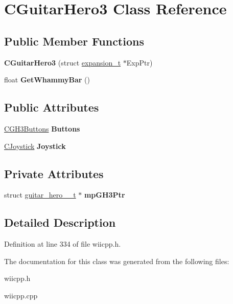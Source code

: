 \hypertarget{class_c_guitar_hero3}{\section{C\-Guitar\-Hero3 Class Reference}
\label{class_c_guitar_hero3}
}
\subsection*{Public Member Functions}
\begin{DoxyCompactItemize}
\item 
\hypertarget{class_c_guitar_hero3_afbef4e83211e146d2aef1064fcc24bb7}{{\bfseries C\-Guitar\-Hero3} (struct \hyperlink{structexpansion__t}{expansion\-\_\-t} $\ast$Exp\-Ptr)}\label{class_c_guitar_hero3_afbef4e83211e146d2aef1064fcc24bb7}

\item 
\hypertarget{class_c_guitar_hero3_ae4066620ae4ba771306e6439968504e6}{float {\bfseries Get\-Whammy\-Bar} ()}\label{class_c_guitar_hero3_ae4066620ae4ba771306e6439968504e6}

\end{DoxyCompactItemize}
\subsection*{Public Attributes}
\begin{DoxyCompactItemize}
\item 
\hypertarget{class_c_guitar_hero3_a70e8e38de7e281c5a7af18cf09747d48}{\hyperlink{class_c_g_h3_buttons}{C\-G\-H3\-Buttons} {\bfseries Buttons}}\label{class_c_guitar_hero3_a70e8e38de7e281c5a7af18cf09747d48}

\item 
\hypertarget{class_c_guitar_hero3_a2a91b61b396cf329e979a66c729c3768}{\hyperlink{class_c_joystick}{C\-Joystick} {\bfseries Joystick}}\label{class_c_guitar_hero3_a2a91b61b396cf329e979a66c729c3768}

\end{DoxyCompactItemize}
\subsection*{Private Attributes}
\begin{DoxyCompactItemize}
\item 
\hypertarget{class_c_guitar_hero3_acc60e4790cac101dfc4812371efcd476}{struct \hyperlink{structguitar__hero__3__t}{guitar\-\_\-hero\-\_\-\_\-t} $\ast$ {\bfseries mp\-G\-H3\-Ptr}}\label{class_c_guitar_hero3_acc60e4790cac101dfc4812371efcd476}

\end{DoxyCompactItemize}


\subsection{Detailed Description}


Definition at line 334 of file wiicpp.\-h.



The documentation for this class was generated from the following files\-:\begin{DoxyCompactItemize}
\item 
wiicpp.\-h\item 
wiicpp.\-cpp\end{DoxyCompactItemize}
